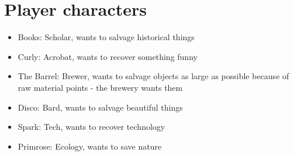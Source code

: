 \section{Player characters}

\begin{itemize}
\item Books: Scholar, wants to salvage historical things
\item Curly: Acrobat, wants to recover something funny
\item The Barrel: Brewer, wants to salvage objects as large as possible because of raw material points - the brewery wants them
\item Disco: Bard, wants to salvage beautiful things
\item Spark: Tech, wants to recover technology
\item Primrose: Ecology, wants to save nature
\end{itemize}

